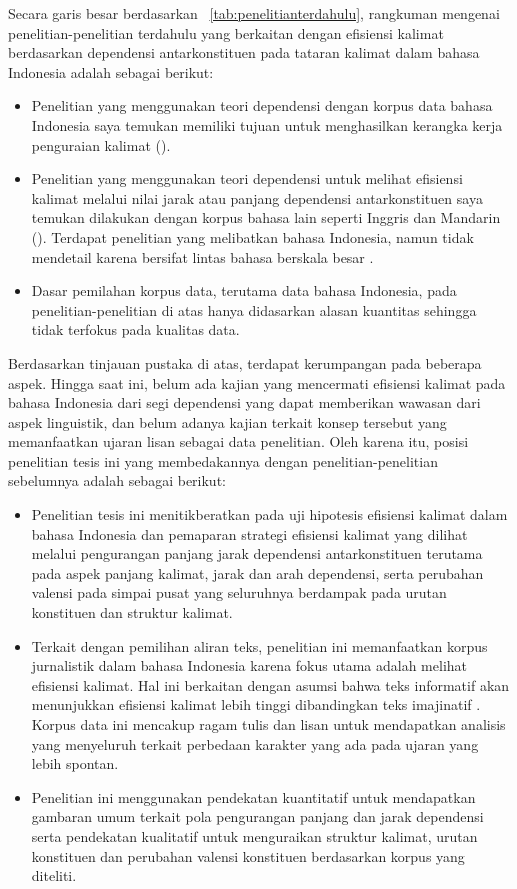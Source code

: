 Secara garis besar berdasarkan \tab~\ref{tab:penelitianterdahulu}, rangkuman mengenai penelitian-penelitian terdahulu yang berkaitan dengan efisiensi kalimat berdasarkan dependensi antarkonstituen pada tataran kalimat dalam bahasa Indonesia adalah sebagai berikut:
\begin{itemize}
\item Penelitian yang menggunakan teori dependensi dengan korpus data bahasa Indonesia saya temukan memiliki tujuan untuk menghasilkan kerangka kerja penguraian kalimat (\citealp{kamayani2011dependency, green2012indonesian, irmawati2015dependency}).
\item Penelitian yang menggunakan teori dependensi untuk melihat efisiensi kalimat melalui nilai jarak atau panjang dependensi antarkonstituen saya temukan dilakukan dengan korpus bahasa lain seperti Inggris dan Mandarin (\citealp{jiang2015effects, wang2017effects}). Terdapat penelitian yang melibatkan bahasa Indonesia, namun tidak mendetail karena bersifat lintas bahasa berskala besar \citep{futrell2015large}.
\item Dasar pemilahan korpus data, terutama data bahasa Indonesia, pada penelitian-penelitian di atas hanya didasarkan alasan kuantitas sehingga tidak terfokus pada kualitas data. 
\end{itemize}
Berdasarkan tinjauan pustaka di atas, terdapat kerumpangan pada beberapa aspek. Hingga saat ini, belum ada kajian yang mencermati efisiensi kalimat pada bahasa Indonesia dari segi dependensi yang dapat memberikan wawasan dari aspek linguistik, dan belum adanya kajian terkait konsep tersebut yang memanfaatkan ujaran lisan sebagai data penelitian. Oleh karena itu, posisi penelitian tesis ini yang membedakannya dengan penelitian-penelitian sebelumnya adalah sebagai berikut:
\begin{itemize}
\item Penelitian tesis ini menitikberatkan pada uji hipotesis efisiensi kalimat dalam bahasa Indonesia dan pemaparan strategi efisiensi kalimat yang dilihat melalui pengurangan panjang jarak dependensi antarkonstituen terutama pada aspek panjang kalimat, jarak dan arah dependensi, serta perubahan valensi pada simpai pusat yang seluruhnya berdampak pada urutan konstituen dan struktur kalimat.
\item Terkait dengan pemilihan aliran teks, penelitian ini memanfaatkan korpus jurnalistik dalam bahasa Indonesia karena fokus utama adalah melihat efisiensi kalimat. Hal ini berkaitan dengan asumsi bahwa teks informatif akan menunjukkan efisiensi kalimat lebih tinggi dibandingkan teks imajinatif \citep{wang2017effects}. Korpus data ini mencakup ragam tulis dan lisan untuk mendapatkan analisis yang menyeluruh terkait perbedaan karakter yang ada pada ujaran yang lebih spontan.
\item Penelitian ini menggunakan pendekatan kuantitatif untuk mendapatkan gambaran umum terkait pola pengurangan panjang dan jarak dependensi serta pendekatan kualitatif untuk menguraikan struktur kalimat, urutan konstituen dan perubahan valensi konstituen berdasarkan korpus yang diteliti.
\end{itemize}

